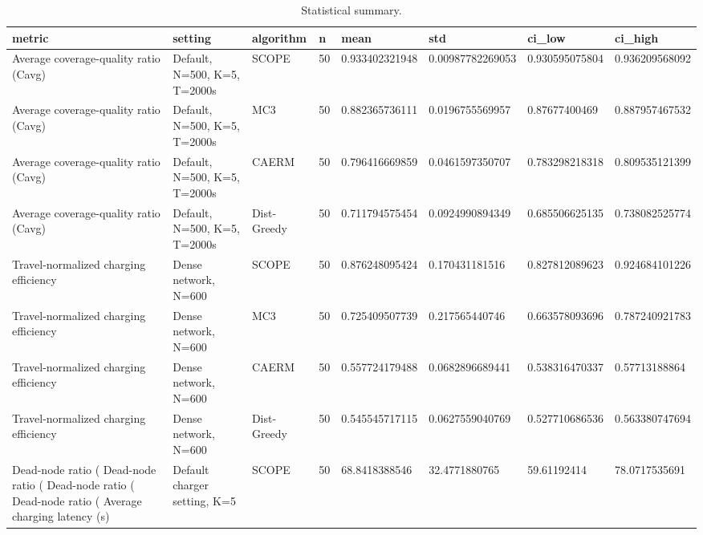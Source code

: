 \begin{table}[t]
\centering
\caption{Statistical summary.}
\begin{tabular}{llllllll}
\hline
metric & setting & algorithm & n & mean & std & ci\_low & ci\_high \\
\hline
Average coverage-quality ratio (Cavg) & Default, N=500, K=5, T=2000s & SCOPE & 50 & 0.933402321948 & 0.00987782269053 & 0.930595075804 & 0.936209568092 \\
Average coverage-quality ratio (Cavg) & Default, N=500, K=5, T=2000s & MC3 & 50 & 0.882365736111 & 0.0196755569957 & 0.87677400469 & 0.887957467532 \\
Average coverage-quality ratio (Cavg) & Default, N=500, K=5, T=2000s & CAERM & 50 & 0.796416669859 & 0.0461597350707 & 0.783298218318 & 0.809535121399 \\
Average coverage-quality ratio (Cavg) & Default, N=500, K=5, T=2000s & Dist-Greedy & 50 & 0.711794575454 & 0.0924990894349 & 0.685506625135 & 0.738082525774 \\
Travel-normalized charging efficiency & Dense network, N=600 & SCOPE & 50 & 0.876248095424 & 0.170431181516 & 0.827812089623 & 0.924684101226 \\
Travel-normalized charging efficiency & Dense network, N=600 & MC3 & 50 & 0.725409507739 & 0.217565440746 & 0.663578093696 & 0.787240921783 \\
Travel-normalized charging efficiency & Dense network, N=600 & CAERM & 50 & 0.557724179488 & 0.0682896689441 & 0.538316470337 & 0.57713188864 \\
Travel-normalized charging efficiency & Dense network, N=600 & Dist-Greedy & 50 & 0.545545717115 & 0.0627559040769 & 0.527710686536 & 0.563380747694 \\
Dead-node ratio (%
Dead-node ratio (%
Dead-node ratio (%
Dead-node ratio (%
Average charging latency (s) & Default charger setting, K=5 & SCOPE & 50 & 68.8418388546 & 32.4771880765 & 59.61192414 & 78.0717535691 \\

\end{tabular}
\end{table}
